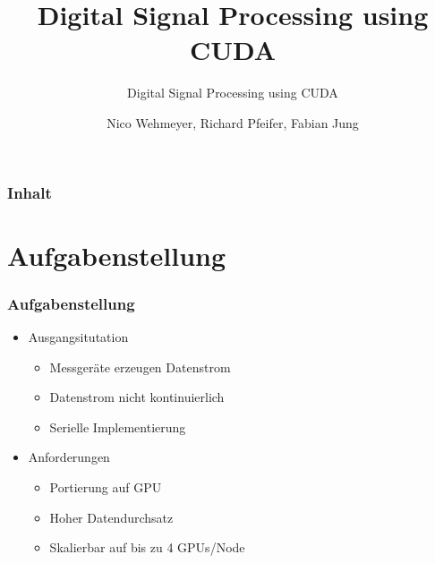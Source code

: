\documentclass[ddcfooter]{tudbeamer}
\begin{document}
\title[Digital Signal Processing]{Digital Signal Processing using CUDA}
\subtitle{Digital Signal Processing using CUDA}
\author{Nico Wehmeyer, Richard Pfeifer, Fabian Jung}

\maketitle

\begin{frame}
    \frametitle*{Inhalt}
    \tableofcontents[currentsection]
\end{frame}

\section{Aufgabenstellung}
\begin{frame}
\frametitle{Aufgabenstellung}
\begin{itemize} 
	\item{Ausgangsitutation}
	\begin{itemize}
		\item{Messgeräte erzeugen Datenstrom} %
		\item{Datenstrom nicht kontinuierlich}
		\item{Serielle Implementierung}
	\end{itemize}
	\item{Anforderungen}
	\begin{itemize}
		\item{Portierung auf GPU}
		\item{Hoher Datendurchsatz}
		\item{Skalierbar auf bis zu 4 GPUs/Node}
	\end{itemize}
\end{itemize}
\end{frame}

\end{document}
